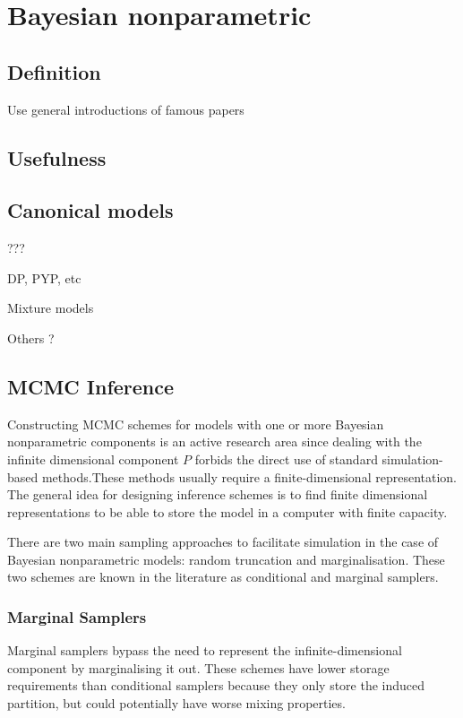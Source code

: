 \chapter{Bayesian nonparametric}

\section{Definition} \label{BNP_def}
Use general introductions of famous papers

\section{Usefulness}

\section{Canonical models}
???

DP, PYP, etc

Mixture models

Others ?

\section{MCMC Inference}

Constructing MCMC schemes for models with one or more Bayesian nonparametric components is an active research area since dealing with the infinite dimensional component $P$ forbids the direct use of standard simulation-based methods.These methods usually require a finite-dimensional representation. The general idea for designing inference schemes is to find finite dimensional representations to be able to store the model in a computer with finite capacity.

There are two main sampling approaches to facilitate simulation in the case of Bayesian nonparametric models: random truncation and marginalisation. These two schemes are known in the literature as conditional and marginal samplers.

\subsection{Marginal Samplers}
Marginal samplers bypass the need to represent the infinite-dimensional component by marginalising it out. These schemes have lower storage requirements than conditional samplers because they only store the induced partition, but could potentially have worse mixing properties.

